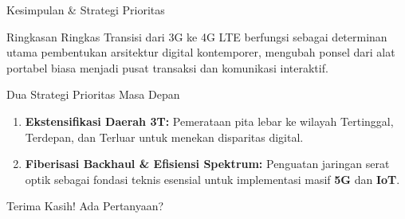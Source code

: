 \documentclass[10pt,aspectratio=169]{beamer}
\begin{document}
\begin{frame}{Kesimpulan \& Strategi Prioritas}
  \begin{block}{Ringkasan Ringkas}
    Transisi dari 3G ke 4G LTE berfungsi sebagai determinan utama pembentukan arsitektur digital kontemporer, mengubah ponsel dari alat portabel biasa menjadi pusat transaksi dan komunikasi interaktif.
  \end{block}

  \begin{block}{Dua Strategi Prioritas Masa Depan}
    \begin{enumerate}
      \item \textbf{Ekstensifikasi Daerah 3T:} Pemerataan pita lebar ke wilayah Tertinggal, Terdepan, dan Terluar untuk menekan disparitas digital.
      \item \textbf{Fiberisasi Backhaul \& Efisiensi Spektrum:} Penguatan jaringan serat optik sebagai fondasi teknis esensial untuk implementasi masif \textbf{5G} dan \textbf{IoT}.
    \end{enumerate}
  \end{block}
\end{frame}

\begin{frame}[standout]
  Terima Kasih!
  \vspace{1em}
  {\small Ada Pertanyaan?}
\end{frame}
\end{document}
